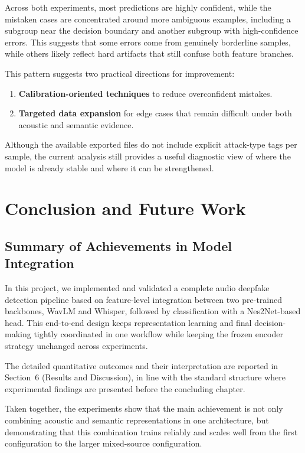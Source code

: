 \documentclass[11pt,a4paper]{article}
\begin{document}
Across both experiments, most predictions are highly confident, while the mistaken
cases are concentrated around more ambiguous examples, including a subgroup near
the decision boundary and another subgroup with high-confidence errors. This
suggests that some errors come from genuinely borderline samples, while others
likely reflect hard artifacts that still confuse both feature branches.

This pattern suggests two practical directions for improvement:

\begin{enumerate}[noitemsep]
  \item \textbf{Calibration-oriented techniques} to reduce overconfident mistakes.
  \item \textbf{Targeted data expansion} for edge cases that remain difficult under
        both acoustic and semantic evidence.
\end{enumerate}

Although the available exported files do not include explicit attack-type tags per
sample, the current analysis still provides a useful diagnostic view of where the
model is already stable and where it can be strengthened.

\section{Conclusion and Future Work}

\subsection{Summary of Achievements in Model Integration}

In this project, we implemented and validated a complete audio deepfake detection
pipeline based on feature-level integration between two pre-trained backbones,
WavLM and Whisper, followed by classification with a Nes2Net-based head. This
end-to-end design keeps representation learning and final decision-making tightly
coordinated in one workflow while keeping the frozen encoder strategy unchanged
across experiments.

The detailed quantitative outcomes and their interpretation are reported in
Section~6 (Results and Discussion), in line with the standard structure where
experimental findings are presented before the concluding chapter.

Taken together, the experiments show that the main achievement is not only
combining acoustic and semantic representations in one architecture, but
demonstrating that this combination trains reliably and scales well from the first
configuration to the larger mixed-source configuration.
\end{document}
